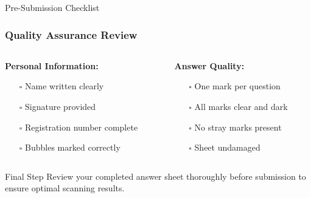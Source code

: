 \documentclass{beamer}
\begin{document}
\begin{frame}{Pre-Submission Checklist}
\frametitle{Quality Assurance Review}
\begin{columns}
\begin{column}{0.5\textwidth}
\textbf{Personal Information:}
\begin{itemize}
\item[$\square$] Name written clearly
\item[$\square$] Signature provided
\item[$\square$] Registration number complete
\item[$\square$] Bubbles marked correctly
\end{itemize}
\end{column}

\begin{column}{0.5\textwidth}
\textbf{Answer Quality:}
\begin{itemize}
\item[$\square$] One mark per question
\item[$\square$] All marks clear and dark
\item[$\square$] No stray marks present
\item[$\square$] Sheet undamaged
\end{itemize}
\end{column}
\end{columns}

\begin{block}{Final Step}
Review your completed answer sheet thoroughly before submission to ensure optimal scanning results.
\end{block}
\end{frame}
\end{document}
